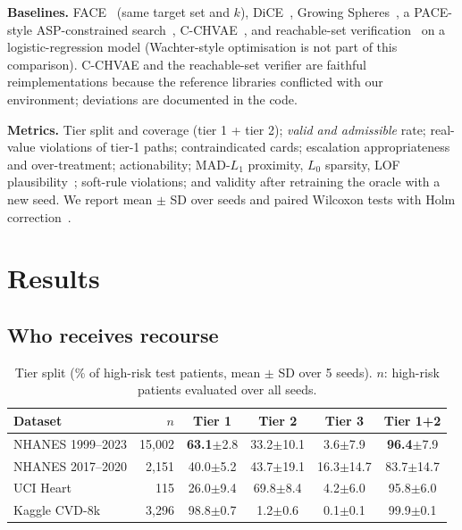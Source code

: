 \documentclass[conference]{IEEEtran}
\begin{document}
\textbf{Baselines.} FACE~\cite{poyiadzi2020face} (same target set and $k$), DiCE~\cite{mothilal2020dice}, Growing Spheres~\cite{laugel2018growing}, a PACE-style ASP-constrained search~\cite{pace2026}, C-CHVAE~\cite{pawelczyk2020cchvae}, and reachable-set verification~\cite{kothari2024reach} on a logistic-regression model (Wachter-style optimisation is not part of this comparison). C-CHVAE and the reachable-set verifier are faithful reimplementations because the reference libraries conflicted with our environment; deviations are documented in the code.

\textbf{Metrics.} Tier split and coverage (tier 1 + tier 2); \emph{valid and admissible} rate; real-value violations of tier-1 paths; contraindicated cards; escalation appropriateness and over-treatment; actionability; MAD-$L_1$ proximity, $L_0$ sparsity, LOF plausibility~\cite{breunig2000lof}; soft-rule violations; and validity after retraining the oracle with a new seed. We report mean $\pm$ SD over seeds and paired Wilcoxon tests with Holm correction~\cite{holm1979}.

\section{Results}\label{sec:results}
\subsection{Who receives recourse}
\begin{table}[t]
\centering
\caption{Tier split (\% of high-risk test patients, mean $\pm$ SD over 5 seeds). $n$: high-risk patients evaluated over all seeds.}
\label{tab:tiers}
\footnotesize
\setlength{\tabcolsep}{1.6pt}
\begin{tabular}{@{}lrcccc@{}}
\toprule
Dataset & $n$ & Tier 1 & Tier 2 & Tier 3 & Tier 1+2 \\
\midrule
NHANES 1999--2023 & 15,002 & \textbf{63.1}$\pm$2.8 & 33.2$\pm$10.1 & 3.6$\pm$7.9 & \textbf{96.4}$\pm$7.9 \\
NHANES 2017--2020 & 2,151 & 40.0$\pm$5.2 & 43.7$\pm$19.1 & 16.3$\pm$14.7 & 83.7$\pm$14.7 \\
UCI Heart & 115 & 26.0$\pm$9.4 & 69.8$\pm$8.4 & 4.2$\pm$6.0 & 95.8$\pm$6.0 \\
Kaggle CVD-8k & 3,296 & 98.8$\pm$0.7 & 1.2$\pm$0.6 & 0.1$\pm$0.1 & 99.9$\pm$0.1 \\
\bottomrule
\end{tabular}
\end{table}
\end{document}
